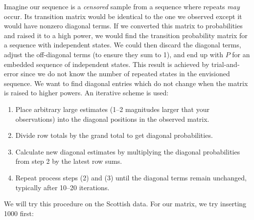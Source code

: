 \begin{example}
	Imagine our sequence is a \emph{censored} sample from a sequence where repeats \emph{may} occur.  Its 
transition matrix would be identical to the one we observed except it would have nonzero 
diagonal terms.  If we converted this matrix to probabilities and raised it to a high power, we 
would find the transition probability matrix for a sequence with independent states.  We could 
then discard the diagonal terms, adjust the off-diagonal terms (to ensure they sum to 1), and end up with $P$ 
for an embedded sequence of independent states.  This result is achieved by trial-and-error 
since we do not know the number of repeated states in the envisioned sequence.  We want to find 
diagonal entries which do not change when the matrix is raised to higher powers.  An iterative scheme is used:
\begin{enumerate}
\item	Place arbitrary large estimates (1--2 magnitudes larger that your observations) into the diagonal positions in the observed 
matrix.
\item	Divide row totals by the grand total to get diagonal probabilities.
\item	Calculate new diagonal estimates by multiplying the diagonal probabilities from step 2 by the 
latest row sums.
\item	Repeat process steps (2) and (3) until the diagonal terms remain unchanged, typically after 
10--20 iterations.
\end{enumerate}
We will try this procedure on the Scottish data.  For our matrix, we try inserting 1000 first:
\begin{equation}

\end{equation}
\end{example}
